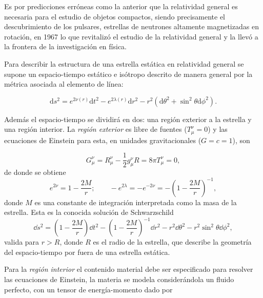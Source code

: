 Es por predicciones erróneas como la anterior que la relatividad general es necesaria para el estudio de objetos compactos, siendo precisamente el descubrimiento de los pulsares, estrellas de neutrones altamente magnetizadas en rotación, en 1967 \cite{Hewish1968ObservationSource} lo que revitalizó el estudio de la relatividad general y la llevó a la frontera de la investigación en física.

Para describir la estructura de una estrella estática en relatividad general se supone un espacio-tiempo estático e isótropo descrito de manera general por la métrica asociada al elemento de línea:

\begin{equation}
\mathrm { d } s ^ { 2 } = e ^ { 2 \nu ( r ) } \mathrm { d } t ^ { 2 } - e ^ { 2 \lambda ( r ) } \mathrm { d } r ^ { 2 } - r ^ { 2 } \left( \mathrm { d } \theta ^ { 2 } + \sin ^ { 2 }  \theta  \mathrm { d } \phi ^ { 2 } \right) .   
\end{equation}

Además el espacio-tiempo se dividirá en dos: una región exterior a la estrella y una región interior. 
La \textit{región exterior} es libre de fuentes ($T _ { \mu } ^ { \nu }=0$) y las ecuaciones de Einstein para esta, en unidades gravitacionales ($G=c=1$), son 

\begin{equation}
    G _ { \mu } ^ { \nu } = R _ { \mu } ^ { \nu } - \frac { 1 } { 2 } g _ { \mu } ^ { \nu } R = 8 \pi T _ { \mu } ^ { \nu }=0,
\end{equation}
de donde se obtiene
\begin{equation}
    e ^ { 2 \nu } = 1 - \frac { 2 M } { r };\quad \quad - e ^ { 2 \lambda } = - e ^ { - 2 \nu } = - \left( 1 - \frac { 2 M } { r } \right) ^ { - 1 },
\end{equation}
donde $M$ es una constante de integración interpretada como la masa de la estrella. Esta es la conocida solución de Schwarzschild
\begin{equation}
    \dd s ^ { 2 } =  \left( 1 - \frac { 2 M } { r } \right) \dd t ^ { 2 } - \left( 1 - \frac { 2 M } { r } \right) ^ { - 1 } \dd r ^ { 2 }  - r ^ { 2 } \dd \theta ^ { 2 } - r ^ { 2 } \sin ^ { 2 } \theta \dd \phi ^ { 2 }, 
\end{equation}
valida para $r>R$, donde $R$ es el radio de la estrella, que describe la geometría del espacio-tiempo por fuera de una estrella estática.

Para la \textit{región interior} el contenido material debe ser especificado para resolver las ecuaciones de Einstein, la materia se modela considerándola un fluido perfecto, con un tensor de energía-momento dado por

